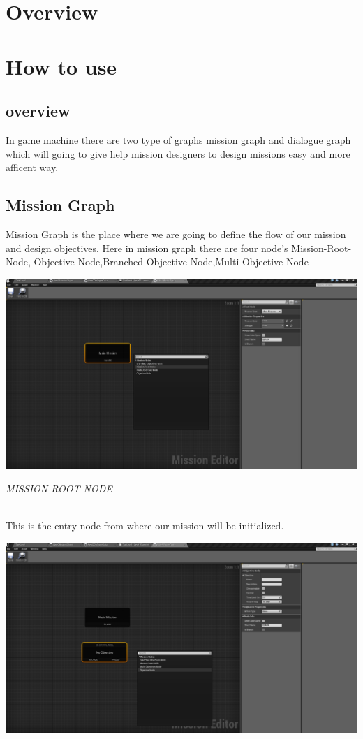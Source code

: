 \documentclass[12pt]{article}
\begin{document}
\section{Overview}
\section{How to use}
	  \subsection{overview}
	  In game machine there are two type of graphs mission graph and dialogue graph which will going to give help mission designers to design missions easy and more afficent way.   
	  \subsection{Mission Graph}
	  Mission Graph is the place where we are going to define the flow of our mission and design objectives.
	  Here in mission graph there are four node's Mission-Root-Node, Objective-Node,Branched-Objective-Node,Multi-Objective-Node
	  \begin{center}
	  \includegraphics[scale=0.2]{MissionRootNode.png}
	  \end{center}
	  \begin{center}
	  \textit{MISSION ROOT NODE}\\
	  --------------------------------------
	  \end{center}
	  This is the entry node from where our mission will be initialized.
	  \begin{center}
	  \includegraphics[scale=0.2]{ObjectiveNode.png}
	  \end{center}
\end{document}
